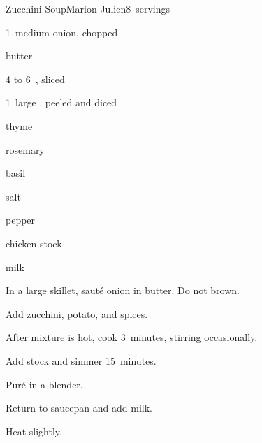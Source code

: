\begin{recipe}{Zucchini Soup\UNTESTED}{Marion Julien}{8~servings}

\begin{ingredients}
\item 1~medium onion, chopped
\item {} butter
\item 4 to 6~, sliced
\item 1~large , peeled and diced
\item \tp{\quarter} thyme
\item \tp{\quarter} rosemary
\item \tp{\quarter} basil
\item \tp{\quarter} salt
\item pepper
\item {} chicken stock
\item {} milk
\end{ingredients}

\begin{directions}
\item In a large skillet, saut\'e onion in butter. Do not brown.
\item Add zucchini, potato, and spices.
\item After mixture is hot, cook 3~minutes, stirring occasionally.
\item Add stock and simmer 15~minutes.
\item Pur\'e in a blender.
\item Return to saucepan and add milk.
\item Heat slightly.
\end{directions}

\end{recipe}
